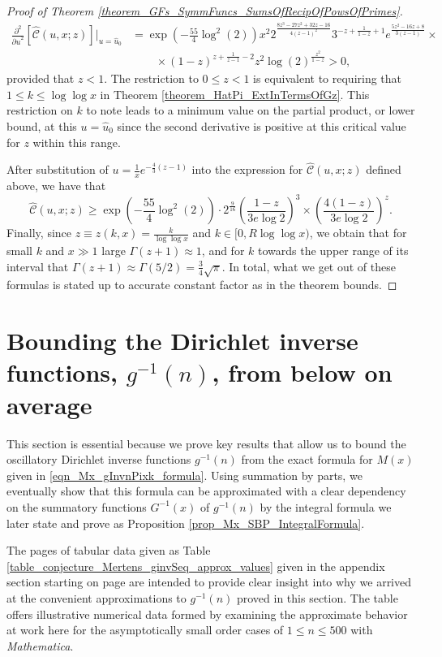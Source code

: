 \documentclass[11pt,reqno,a4letter]{article}
\numberwithin{figure}{section}
\numberwithin{table}{section}
\theoremstyle{plain}
\numberwithin{theorem}{section}
\theoremstyle{definition}
\begin{document}
\begin{proof}[Proof of Theorem \ref{theorem_GFs_SymmFuncs_SumsOfRecipOfPowsOfPrimes}]
\begin{align*}
\frac{\partial^2}{{\partial u}^2}\left[\widehat{\mathcal{C}}(u, x; z)\right] \Biggr\rvert_{u = \hat{u}_0} & = 
     \exp\left(-\frac{55}{4} \log^2(2)\right) x^2 2^{\frac{8 z^3-27 z^2+32 z-16}{4 (z-1)^2}} 
     3^{-z+\frac{1}{1-z}+1} e^{\frac{5 z^2-16 z+8}{3 (z-1)}} \times \\ 
     & \phantom{=\times} \times (1-z)^{z+\frac{1}{z-1}-2} z^2
     \log(2)^{\frac{z^2}{1-z}} > 0, 
\end{align*} 
provided that $z < 1$. 
The restriction to $0 \leq z < 1$ is equivalent to requiring that 
$1 \leq k \leq \log\log x$ in Theorem \ref{theorem_HatPi_ExtInTermsOfGz}. 
This restriction on $k$ to note 
leads to a minimum value on the partial product, or lower bound, at this $u = \hat{u}_0$ 
since the second derivative is positive at this critical value for $z$ within this range. 

After substitution of $u = \frac{1}{x} e^{-\frac{4}{3}(z-1)}$ into the expression for 
$\widehat{\mathcal{C}}(u, x; z)$ defined above, we have that 
\[
\widehat{\mathcal{C}}(u, x; z) \geq \exp\left(-\frac{55}{4} \log^2(2)\right) \cdot 2^{\frac{9}{16}} 
     \left(\frac{1-z}{3e\log 2}\right)^3 \times \left(\frac{4(1-z)}{3e\log 2}\right)^z. 
\]
Finally, since $z \equiv z(k, x) = \frac{k}{\log\log x}$ and $k \in [0, R\log\log x)$, we obtain that 
for small $k$ and $x \gg 1$ large $\Gamma(z+1) \approx 1$, and for $k$ towards the upper range of 
its interval that $\Gamma(z+1) \approx \Gamma(5/2) = \frac{3}{4} \sqrt{\pi}$. 
In total, what we get out of these formulas is stated up to accurate 
constant factor as in the theorem bounds. 
\end{proof} 

\newpage
\section{Bounding the Dirichlet inverse functions, $g^{-1}(n)$, from below on average} 
\label{Section_InvFunc_PreciseExpsAndAsymptotics} 

This section is essential because we prove key results that allow us to 
bound the oscillatory 
Dirichlet inverse functions $g^{-1}(n)$ from the exact formula for $M(x)$ given in 
\eqref{eqn_Mx_gInvnPixk_formula}. 
Using summation by parts, we eventually show that this formula can be approximated with a clear 
dependency on the summatory functions $G^{-1}(x)$ of $g^{-1}(n)$ by the integral formula we later 
state and prove as Proposition \ref{prop_Mx_SBP_IntegralFormula}. 

The pages of tabular data given as Table \ref{table_conjecture_Mertens_ginvSeq_approx_values} 
given in the appendix section starting on 
page \pageref{table_conjecture_Mertens_ginvSeq_approx_values} are intended to 
provide clear insight into why we arrived at the convenient approximations to 
$g^{-1}(n)$ proved in this section. The table offers illustrative 
numerical data formed by examining the approximate behavior 
at work here for the asymptotically 
small order cases of $1 \leq n \leq 500$ with \emph{Mathematica}. 
\end{document}
